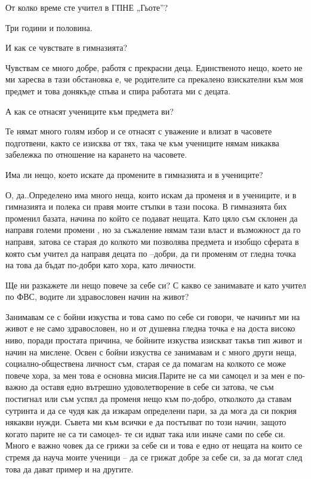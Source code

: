 \begin{multicols}{3}

От колко време сте учител в ГПНЕ „Гьоте”?

Три години и половина.

И как се чувствате в гимназията?

Чувствам се много добре, работя с прекрасни деца.  Единственото нещо, което не ми харесва в тази обстановка  е,  че родителите са прекалено взискателни към моя предмет и това донякъде спъва и спира работата ми с децата.

А как се отнасят учениците към предмета ви?

Те нямат много голям избор и се отнасят с уважение и влизат в часовете подготвени, както се изисква от тях, така че към учениците нямам никаква забележка по отношение на карането на часовете.

Има ли нещо,  което искате да промените в гимназията и в учениците?

О, да..Определено има  много неща, които искам да променя и в учениците,  и в гимназията и  полека си правя моите стъпки в тази посока. В гимназията бих променил базата, начина по който  се подават нещата. Като цяло съм склонен да направя големи промени , но за съжаление нямам тази власт и възможност да го направя, затова се старая до колкото ми позволява предмета и изобщо сферата в която съм учител да направя децата по –добри, да ги променям от гледна точка на това  да бъдат по-добри като хора, като личности.

Ще ни разкажете ли нещо повече за себе си? С какво се занимавате и като учител по ФВС,  водите ли здравословен начин на живот?

Занимавам се с бойни изкуства и това само по себе си говори,  че начинът ми на живот е не само здравословен, но и от душевна гледна точка е на доста високо ниво, поради простата причина,  че бойните изкуства изискват такъв тип живот  и начин на мислене. Освен с бойни изкуства се занимавам и с много други неща, социално-обществена личност съм, старая се да помагам на колкото се може повече хора, за мен това е основна мисия.Парите не са ми самоцел и за мен е по-важно да оставя едно вътрешно удоволетворение  в себе си затова,  че съм постигнал  или съм успял да променя нещо към по-добро, отколкото да ставам сутринта и да се чудя как да изкарам определени пари,  за да мога да си покрия някакви нужди. Съвета ми към всички е да постъпват по този начин, защото когато парите не са ти самоцел- те си идват така или иначе сами по себе си. Много  е важно човек да се  грижи за себе си и това е едно от нещата на които се стремя да науча моите ученици – да се грижат добре за себе си, за да могат след това да дават  пример и на другите.


\end{multicols}
